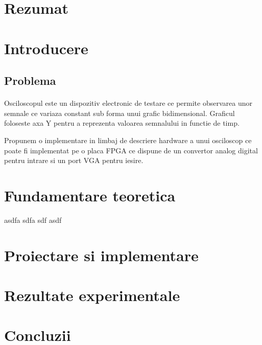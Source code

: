 \documentclass[10pt,a4paper]{article}
\begin{document}




\tableofcontents

\clearpage

\section{Rezumat}
\clearpage

\section{Introducere}

\subsection{Problema}
\paragraph{}
Osciloscopul este un dispozitiv electronic de testare ce permite 
observarea unor semnale ce variaza constant sub forma unui grafic bidimensional.
Graficul foloseste axa Y pentru a reprezenta valoarea semnalului in functie de timp.

Propunem o implementare in limbaj de descriere hardware a unui osciloscop ce poate
fi implementat pe o placa FPGA ce dispune de un convertor analog digital pentru intrare
si un port VGA pentru iesire.

\section{Fundamentare teoretica}
asdfa sdfa sdf asdf

\section{Proiectare si implementare}

\section{Rezultate experimentale}

\section{Concluzii}

\clearpage


\end{document}
